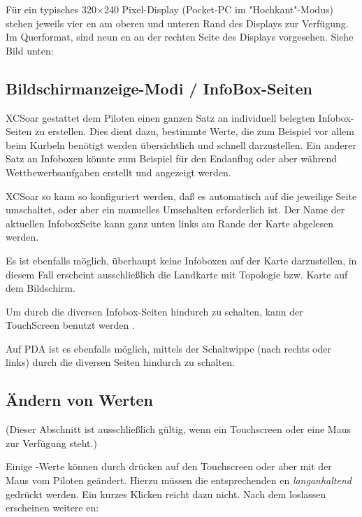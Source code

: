 Für ein typisches 320$\times$240 Pixel-Display (Pocket-\textsf{PC} im "Hochkant"-Modus) stehen jeweils vier {\InfoBox}en am oberen und unteren Rand des Displays zur Verfügung. 
Im Querformat, sind neun {\InfoBox}en an der rechten Seite des Displays vorgesehen. Siehe Bild unten:


\subsection*{Bildschirmanzeige-Modi / InfoBox-Seiten}

\textsf{XCSoar} gestattet dem Piloten einen ganzen Satz an individuell belegten Infobox-Seiten zu erstellen.
Dies dient dazu, bestimmte Werte, die zum Beispiel vor allem beim Kurbeln  benötigt werden übersichtlich und schnell darzustellen.
Ein anderer Satz an Infoboxen könnte zum Beispiel für den Endanflug oder aber während Wettbewerbsaufgaben erstellt und angezeigt werden.

\textsf{XCSoar} so kann so konfiguriert werden, daß es automatisch auf die jeweilige Seite umschaltet, oder aber ein manuelles Umschalten erforderlich ist. Der Name der aktuellen InfoboxSeite kann ganz unten links am Rande der Karte abgelesen werden.

Es ist ebenfalls möglich, überhaupt keine Infoboxen auf der Karte darzustellen, in diesem Fall erscheint ausschließlich die Landkarte mit Topologie bzw. Karte auf dem Bildschirm.

Um durch die diversen Infobox-Seiten hindurch zu schalten, kann der TouchScreen benutzt werden
. 

Auf PDA ist es ebenfalls möglich,  mittels der Schaltwippe  (nach rechts oder links) durch die diversen Seiten hindurch zu schalten.

\subsection*{Ändern von  {\InfoBox} Werten}
(Dieser Abschnitt ist ausschließlich gültig, wenn ein Touchscreen oder eine Maus zur Verfügung steht.)

Einige {\InfoBox}-Werte können durch drücken auf den Touchscreen oder aber mit der Maus vom Piloten geändert.
Hierzu müssen die entsprechenden {\InfoBox}en  \emph{langanhaltend} gedrückt werden.
Ein kurzes Klicken reicht dazu nicht.  Nach dem loslassen erscheinen weitere {\InfoBox}en:

